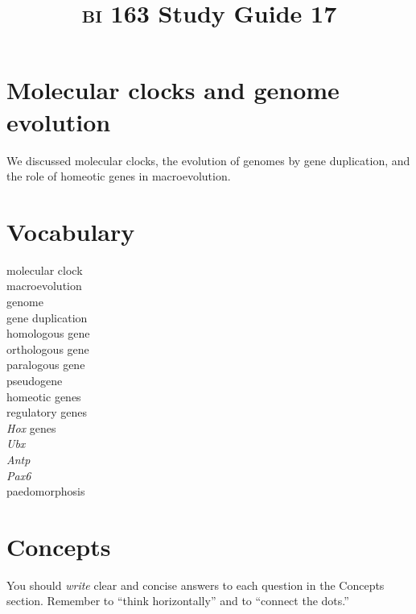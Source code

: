 \documentclass[letterpaper]{tufte-handout}
\title{{\scshape bi} 163 Study Guide 17}
\date{} %
\begin{document}
\maketitle	%

\section*{Molecular clocks and genome evolution}

We discussed molecular clocks, the evolution of genomes by gene duplication, and the role of homeotic genes in macroevolution.

\section*{Vocabulary}

\vspace{-1\baselineskip}
\begin{multicols}{2}
molecular clock \\
macroevolution  \\
genome  \\
gene duplication  \\
homologous gene  \\
orthologous gene \\
paralogous gene \\
pseudogene \\
homeotic genes \\
regulatory genes \\
\textit{Hox} genes \\
\textit{Ubx} \\
\textit{Antp} \\
\textit{Pax6} \\
paedomorphosis

\end{multicols}

\section*{Concepts}

You should \emph{write} clear and concise answers to each question in the Concepts section.  Remember to ``think horizontally'' and to ``connect the dots.'' 
\end{document}

